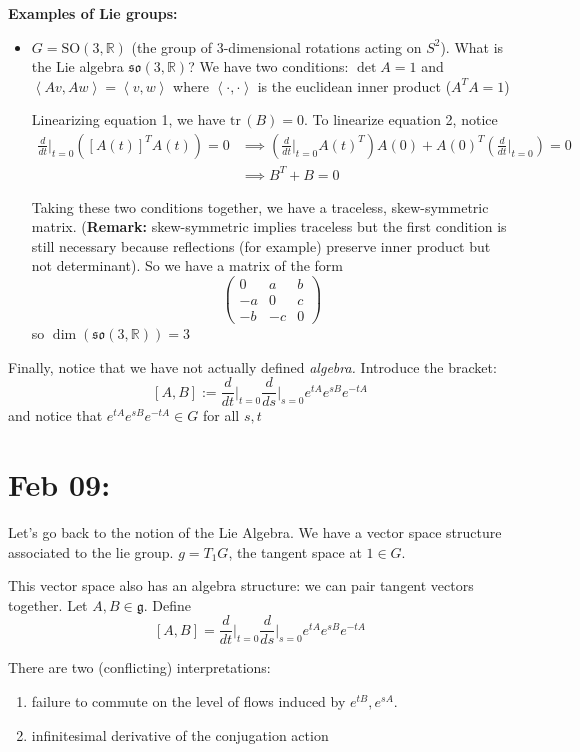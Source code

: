 \documentclass[12pt]{article}
\newcommand{\R}{\mathbb{R}}
\newcommand{\brak}[1]{\left\langle #1 \right\rangle}
\newcommand{\SO}{\text{SO}}
\newcommand{\tr}{\text{tr}\,}
\newcommand{\so}{\mathfrak{so}}
\begin{document}
    \textbf{Examples of Lie groups:}
    \begin{itemize}
        \item $G = \SO(3, \R)$ (the group of 3-dimensional rotations acting on $S^2$). What is the Lie algebra $\so(3, \R)$? We have two conditions: $\det A = 1$ and $\brak{Av, Aw} = \brak{v, w}$ where $\brak{\cdot, \cdot}$ is the euclidean inner product ($A^TA = 1$)
        
        Linearizing equation 1, we have $\tr(B) = 0$. To linearize equation 2, notice 
        \begin{align*}
            \frac{d}{dt}\bigg\vert_{t=0}([A(t)]^T A(t)) = 0 &\implies (\frac{d}{dt}\bigg\vert_{t=0} A(t)^T)A(0) + A(0)^T (\frac{d}{dt}\bigg\vert_{t=0}) = 0\\ 
            &\implies B^T + B= 0 
        \end{align*}

        Taking these two conditions together, we have a traceless, skew-symmetric matrix. (\textbf{Remark:} skew-symmetric implies traceless but the first condition is still necessary because reflections (for example) preserve inner product but not determinant). So we have a matrix of the form 
        \[\begin{pmatrix}
            0 & a & b\\ 
            -a & 0 & c\\ 
            -b & -c & 0
        \end{pmatrix}\]
        so $\dim(\so(3, \R)) = 3$
    \end{itemize}

    Finally, notice that we have not actually defined \emph{algebra.} Introduce the bracket: 
    \[[A, B] := \frac{d}{dt}\bigg\vert_{t=0} \frac{d}{ds}\bigg\vert_{s=0} e^{tA}e^{sB}e^{-tA}\] 
    and notice that $e^{tA}e^{sB}e^{-tA} \in G$ for all $s, t$ 

\section{Feb 09:} 
    Let's go back to the notion of the Lie Algebra. We have a vector space structure associated to the lie group. $g = T_1 G$, the tangent space at $1 \in G$. 

    This vector space also has an algebra structure: we can pair tangent vectors together. Let $A, B \in \mathfrak{g}$. Define
    \[[A, B] = \frac{d}{dt}\bigg\vert_{t=0} \frac{d}{ds}\bigg\vert_{s=0}e^{tA}e^{sB}e^{-tA}\]

    There are two (conflicting) interpretations:
    \begin{enumerate}
        \item failure to commute on the level of flows induced by $e^{tB}, e^{sA}$.
        \item infinitesimal derivative of the conjugation action 
    \end{enumerate}
\end{document}
